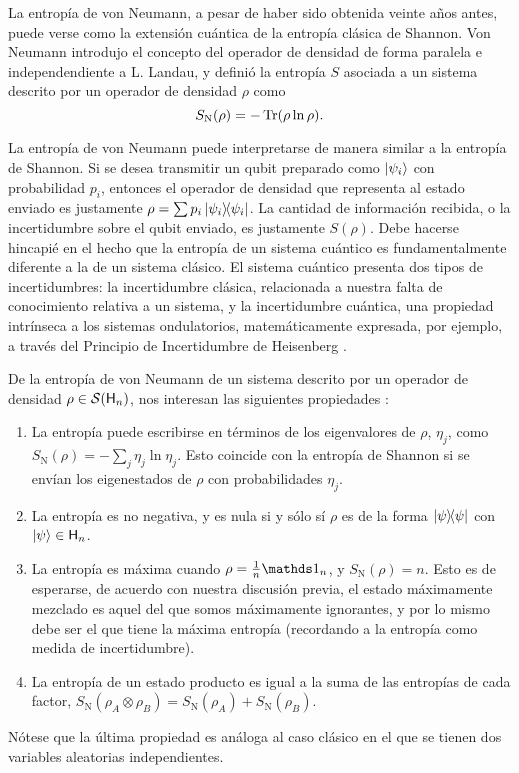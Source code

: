 La entropía de von Neumann, a pesar de haber sido obtenida veinte años antes, puede verse como la extensión cuántica de la entropía clásica de Shannon. Von Neumann introdujo el concepto del operador de densidad de forma paralela e independendiente a L. Landau, y definió la entropía $S$ asociada a un sistema descrito por un operador de densidad $\rho$ como \cite{vonNeumann}
\begin{equation}\label{eq:VonNeumannEntropy}
    S_{\text{N}}(\rho)=-\Tr(\rho\ln{\rho}).
\end{equation}

La entropía de von Neumann puede interpretarse de manera similar a la entropía de Shannon. Si se desea transmitir un qubit preparado como $\ket{\psi_{i}}$ con probabilidad $p_{i}$, entonces el operador de densidad que representa al estado enviado es justamente $\rho=\sum p_{i}\dyad{\psi_{i}}$. La cantidad de información recibida, o la incertidumbre sobre el qubit enviado, es justamente $S(\rho)$. Debe hacerse hincapié en el hecho que la entropía de un sistema cuántico es fundamentalmente diferente a la de un sistema clásico. El sistema cuántico presenta dos tipos de incertidumbres: la incertidumbre clásica, relacionada a nuestra falta de conocimiento relativa a un sistema, y la incertidumbre cuántica, una propiedad intrínseca a los sistemas ondulatorios, matemáticamente expresada, por ejemplo, a través del Principio de Incertidumbre de Heisenberg \cite{Wilde}.


De la entropía de von Neumann de un sistema descrito por un operador de densidad $\rho\in\mathcal{S}({\sf H}_{n})$, nos interesan las siguientes propiedades \cite{Chuang}:
\begin{enumerate}
    \item La entropía puede escribirse en términos de los eigenvalores de $\rho$, $\eta_{j}$, como $S_{\text{N}}(\rho)=-\sum_{j}\eta_{j}\ln{\eta_{j}}$. Esto coincide con la entropía de Shannon si se envían los eigenestados de $\rho$ con probabilidades $\eta_{j}$.
    \item La entropía es no negativa, y es nula si y sólo sí $\rho$ es de la forma $\dyad{\psi}$ con $\ket{\psi}\in{\sf H}_{n}$.
    \item La entropía es máxima cuando $\rho=\frac{1}{n}\Id_{n}$, y $S_{\text{N}}(\rho)=n$. Esto es de esperarse, de acuerdo con nuestra discusión previa, el estado máximamente mezclado es aquel del que somos máximamente ignorantes, y por lo mismo debe ser el que tiene la máxima entropía (recordando a la entropía como medida de incertidumbre).
    \item La entropía de un estado producto es igual a la suma de las entropías de cada factor, $S_{\text{N}}(\rho_{A}\otimes\rho_{B})=S_{\text{N}}(\rho_{A})+S_{\text{N}}(\rho_{B})$.
\end{enumerate}
Nótese que la última propiedad es análoga al caso clásico en el que se tienen dos variables aleatorias independientes.